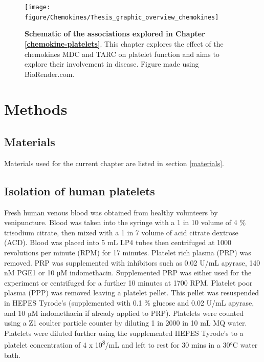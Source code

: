 \documentclass[11pt,twoside]{bristolthesis}
\begin{document}
\begin{figure}
\texttt{[image: figure/Chemokines/Thesis\_graphic\_overview\_chemokines]} \caption[Schematic of the associations explored in Chapter \ref{chemokine-platelets}]{\textbf{Schematic of the associations explored in Chapter \ref{chemokine-platelets}}. This chapter explores the effect of the chemokines MDC and TARC on platelet function and aims to explore their involvement in disease. Figure made using BioRender.com.}\label{fig:chemokine-platelet-graphic}
\end{figure}
\hypertarget{methods-1}{%
\section{Methods}\label{methods-1}}

\hypertarget{materials-1}{%
\subsection{Materials}\label{materials-1}}

Materials used for the current chapter are listed in section \ref{materials}.

\hypertarget{isolation-of-human-platelets}{%
\subsection{Isolation of human platelets}\label{isolation-of-human-platelets}}

Fresh human venous blood was obtained from healthy volunteers by venipuncture. Blood was taken into the syringe with a 1 in 10 volume of 4 \% trisodium citrate, then mixed with a 1 in 7 volume of acid citrate dextrose (ACD). Blood was placed into 5 mL LP4 tubes then centrifuged at 1000 revolutions per minute (RPM) for 17 minutes. Platelet rich plasma (PRP) was removed. PRP was supplemented with inhibitors such as 0.02 U/mL apyrase, 140 nM PGE1 or 10 µM indomethacin. Supplemented PRP was either used for the experiment or centrifuged for a further 10 minutes at 1700 RPM. Platelet poor plasma (PPP) was removed leaving a platelet pellet. This pellet was resuspended in HEPES Tyrode's (supplemented with 0.1 \% glucose and 0.02 U/mL apyrase, and 10 µM indomethacin if already applied to PRP). Platelets were counted using a Z1 coulter particle counter by diluting 1 in 2000 in 10 mL MQ water. Platelets were diluted further using the supplemented HEPES Tyrode's to a platelet concentration of 4 x 10\textsuperscript{8}/mL and left to rest for 30 mins in a 30°C water bath.
\end{document}
